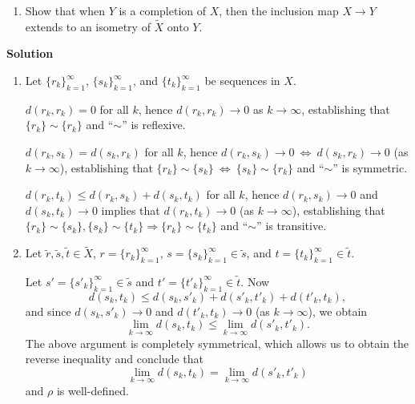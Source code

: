 \documentclass{article}
\begin{document}
\begin{enumerate}
\begin{itemize}
{\begin{enumerate}
{\em Note:}  If a complete metric space \(Y\) contains \(X\) as a dense subspace, we say that \(Y\) is a {\em completion} of \(X\).  The space \(\tilde{X}\) of Exercise 7 can be regarded as a completion of \(X\) by identifying each \(x \in X\) with the constant sequence \(\{x, x, \ldots\}\).  The next part of the exercise shows that the completion of \(X\) is unique, up to isometry.
\item Show that when \(Y\) is a completion of \(X\), then the inclusion map \(X \to Y\) extends to an isometry of \(\tilde{X}\) onto \(Y\).
\end{enumerate}}

{\bf Solution}

\begin{enumerate}
\item Let \(\{r_k\}_{k = 1}^{\infty}\), \(\{s_k\}_{k = 1}^{\infty}\), and \(\{t_k\}_{k = 1}^{\infty}\) be sequences in \(X\).

\(d(r_k,r_k) = 0\) for all \(k\), hence \(d(r_k,r_k) \to 0\) as \(k \to \infty\), establishing that \(\{r_k\} \sim \{r_k\}\) and ``\(\sim\)'' is reflexive.

\(d(r_k,s_k) = d(s_k,r_k)\) for all \(k\), hence \(d(r_k,s_k) \to 0 \ \Leftrightarrow \ d(s_k,r_k) \to 0\) (as \(k \to \infty\)), establishing that \(\{r_k\} \sim \{s_k\} \ \Leftrightarrow \ \{s_k\} \sim \{r_k\}\) and ``\(\sim\)'' is symmetric.

\(d(r_k,t_k) \leq d(r_k,s_k) + d(s_k,t_k)\) for all \(k\), hence \(d(r_k,s_k) \to 0\) and \(d(s_k,t_k) \to 0\) implies that \(d(r_k,t_k) \to 0\) (as \(k \to \infty\)), establishing that \(\{r_k\} \sim \{s_k\}, \{s_k\} \sim \{t_k\} \Rightarrow \{r_k\} \sim \{t_k\}\) and ``\(\sim\)'' is transitive.

\item Let \(\tilde{r}, \tilde{s}, \tilde{t} \in \tilde{X}\), \(r = \{r_k\}_{k = 1}^{\infty}\), \(s = \{s_k\}_{k = 1}^{\infty} \in \tilde{s}\), and \(t = \{t_k\}_{k = 1}^{\infty} \in \tilde{t}\).

Let \(s' = \{s'_k\}_{k = 1}^{\infty} \in \tilde{s}\) and \(t' = \{t'_k\}_{k = 1}^{\infty} \in \tilde{t}\).  Now
\[d(s_k,t_k) \leq d(s_k,s'_k) + d(s'_k,t'_k) + d(t'_k,t_k),\]
and since \(d(s_k,s'_k) \to 0\) and \(d(t'_k,t_k) \to 0\) (as \(k \to \infty\)), we obtain
\[\lim_{k \to \infty} d(s_k,t_k) \leq \lim_{k \to \infty} d(s'_k,t'_k).\]
The above argument is completely symmetrical, which allows us to obtain the reverse inequality and conclude that
\[\lim_{k \to \infty} d(s_k,t_k) = \lim_{k \to \infty} d(s'_k,t'_k)\]
and \(\rho\) is well-defined.


\end{enumerate}
\end{itemize}
\end{enumerate}
\end{document}
